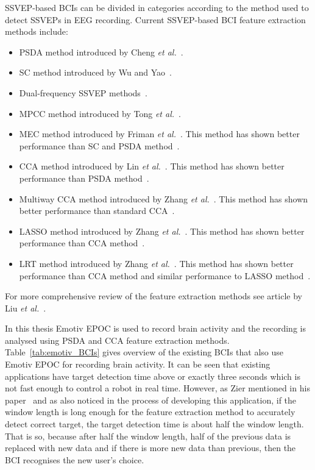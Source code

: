 \gls{SSVEP}-based \glspl{BCI} can be divided in categories according to the method used to detect \glspl{SSVEP} in \gls{EEG} recording. Current \gls{SSVEP}-based \gls{BCI} \gls{feature extraction} methods include:
\begin{itemize}
	\item \Gls{PSDA} method introduced by Cheng \textit{et al.}~\cite{psda}.
	\item \Gls{SC} method introduced by Wu and Yao~\cite{sc}.
	\item Dual-frequency \gls{SSVEP} methods~\cite{dual1, dual2}.
	\item \Gls{MPCC} method introduced by Tong \textit{et al.}~\cite{MPCC}.
	\item \Gls{MEC} method introduced by Friman \textit{et al.}~\cite{mec}. This method has shown better performance than \gls{SC} and \gls{PSDA} method~\cite{mec_comparison}.
	\item \Gls{CCA} method introduced by Lin \textit{et al.}~\cite{cca_lin}. This method has shown better performance than \gls{PSDA} method~\cite{cca_psda, bin2009cca, cca_lin}.
	\item Multiway \gls{CCA} method introduced by Zhang \textit{et al.}~\cite{mcca}. This method has shown better performance than standard \gls{CCA}~\cite{mcca}.
	\item \Gls{LASSO} method introduced by Zhang \textit{et al.}~\cite{LASSO}. This method has shown better performance than \gls{CCA} method~\cite{LASSO}.
	\item \Gls{LRT} method introduced by Zhang \textit{et al.}~\cite{LRT}. This method has shown better performance than \gls{CCA} method and similar performance to \gls{LASSO} method~\cite{LRT}.
\end{itemize}
For more comprehensive review of the \gls{feature extraction} methods see article by Liu \textit{et al.}~\cite{feature_extraction}.

In this thesis Emotiv EPOC is used to record brain activity and the recording is analysed using \gls{PSDA} and \gls{CCA} \gls{feature extraction} methods. Table~\ref{tab:emotiv_BCIs} gives overview of the existing \glspl{BCI} that also use Emotiv EPOC for recording brain activity. It can be seen that existing applications have \gls{target} detection time above or exactly three seconds which is not fast enough to control a robot in real time. However, as Zier mentioned in his paper~\cite{emotiv_psda} and as also noticed in the process of developing this application, if the \gls{window} length is long enough for the \gls{feature extraction} method to accurately detect correct \gls{target}, the \gls{target} detection time is about half the \gls{window} length. That is so, because after half the \gls{window} length, half of the previous data is replaced with new data and if there is more new data than previous, then the \gls{BCI} recognises the new user's choice.

